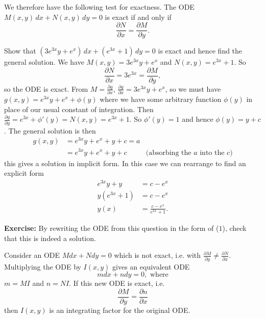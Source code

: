 \documentclass[10pt, a4paper]{article}
\begin{document}
We therefore have the following test for exactness.
The ODE $M(x, y)\,dx + N(x, y)\,dy = 0$ is exact if and only if
\[
\frac{\partial N}{\partial x} = \frac{\partial M}{\partial y}.
\]
\begin{example}
    Show that $(3e ^ {3x}y + e ^ x)\,dx + (e ^ {3x} + 1)\,dy = 0$
    is exact and hence find the general solution.
    We have $M(x, y) = 3e ^ {3x}y + e ^ x$ and $N(x, y) = e ^ {3x} + 1$.
    So
    \[
    \frac{\partial N}{\partial x} = 3e ^ {3x} = \frac{\partial M}{\partial y},
    \]
    so the ODE is exact.
    From $M = \frac{\partial g}{\partial x}$, $\frac{\partial g}{\partial x} = 3e ^ {3x}y + e ^ x$,
    so we must have $g(x, y) = e ^ {3x}y + e ^ x + \phi(y)$ where we have some arbitrary function $\phi(y)$ in place of our usual constant of integration.
    Then $\frac{\partial g}{\partial y} = e ^ {3x} + \phi'(y) = N(x, y) = e ^ {3x} + 1$.
    So $\phi'(y) = 1$ and hence $\phi(y) = y + c$.
    The general solution is then
    \begin{align*}
        g(x, y) &= e ^ {3x}y + e ^ x + y + c = a \\
        &= e ^ {3x}y + e ^ x + y + c &\text{(absorbing the $a$ into the $c$)}
    \end{align*}
    this gives a solution in implicit form.
    In this case we can rearrange to find an explicit form
    \begin{align*}
        e ^ {3x}y + y &= c - e ^ x \\
        y(e ^ {3x} + 1) &= c - e ^ x \\
        y(x) &= \frac{c - e ^ x}{e ^ {3x} + 1}.
    \end{align*}
\end{example}

\textbf{Exercise: } By rewriting the ODE from this question in the form of ($1$),
check that this is indeed a solution.

Consider an ODE $Mdx + Ndy = 0$ which is not exact,
i.e. with $\frac{\partial M}{\partial y} \neq \frac{\partial N}{\partial x}$.
Multiplying the ODE by $I(x, y)$ gives an equivalent ODE
\[
mdx + ndy = 0,\text{ where}
\]
$m = MI$ and $n = NI$.
If this new ODE is exact,
i.e.
\[
\frac{\partial M}{\partial y} = \frac{\partial n}{\partial x}
\]
then $I(x, y)$ is an integrating factor for the original ODE.
\end{document}
